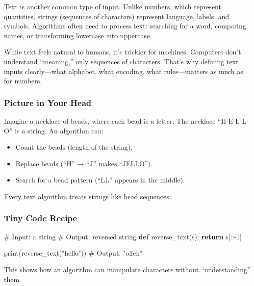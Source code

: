 \documentclass[
  letterpaper,
  DIV=11,
  numbers=noendperiod]{scrreprt}
\newenvironment{Shaded}{\begin{snugshade}}{\end{snugshade}}
\newcommand{\BuiltInTok}[1]{\textcolor[rgb]{0.00,0.23,0.31}{#1}}
\newcommand{\CommentTok}[1]{\textcolor[rgb]{0.37,0.37,0.37}{#1}}
\newcommand{\ControlFlowTok}[1]{\textcolor[rgb]{0.00,0.23,0.31}{\textbf{#1}}}
\newcommand{\DecValTok}[1]{\textcolor[rgb]{0.68,0.00,0.00}{#1}}
\newcommand{\KeywordTok}[1]{\textcolor[rgb]{0.00,0.23,0.31}{\textbf{#1}}}
\newcommand{\NormalTok}[1]{\textcolor[rgb]{0.00,0.23,0.31}{#1}}
\newcommand{\OperatorTok}[1]{\textcolor[rgb]{0.37,0.37,0.37}{#1}}
\newcommand{\StringTok}[1]{\textcolor[rgb]{0.13,0.47,0.30}{#1}}
\providecommand{\tightlist}{%
  \setlength{\itemsep}{0pt}\setlength{\parskip}{0pt}}
\begin{document}
Text is another common type of input. Unlike numbers, which represent
quantities, strings (sequences of characters) represent language,
labels, and symbols. Algorithms often need to process text: searching
for a word, comparing names, or transforming lowercase into uppercase.

While text feels natural to humans, it's trickier for machines.
Computers don't understand ``meaning,'' only sequences of characters.
That's why defining text inputs clearly---what alphabet, what encoding,
what rules---matters as much as for numbers.

\subsubsection{Picture in Your Head}\label{picture-in-your-head-12}

Imagine a necklace of beads, where each bead is a letter. The necklace
``H-E-L-L-O'' is a string. An algorithm can:

\begin{itemize}
\tightlist
\item
  Count the beads (length of the string).
\item
  Replace beads (``H'' → ``J'' makes ``JELLO'').
\item
  Search for a bead pattern (``LL'' appears in the middle).
\end{itemize}

Every text algorithm treats strings like bead sequences.

\subsubsection{Tiny Code Recipe}\label{tiny-code-recipe-11}

\begin{Shaded}
\begin{Highlighting}[]
\CommentTok{\# Input: a string}
\CommentTok{\# Output: reversed string}
\KeywordTok{def}\NormalTok{ reverse\_text(s):}
    \ControlFlowTok{return}\NormalTok{ s[::}\OperatorTok{{-}}\DecValTok{1}\NormalTok{]}

\BuiltInTok{print}\NormalTok{(reverse\_text(}\StringTok{"hello"}\NormalTok{))  }\CommentTok{\# Output: "olleh"}
\end{Highlighting}
\end{Shaded}

This shows how an algorithm can manipulate characters without
``understanding'' them.
\end{document}
